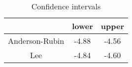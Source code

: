 \begin{table}[ht]
\centering
\begin{tabular}{ccc}
  \hline
 & lower & upper \\ 
  \hline
Anderson-Rubin & -4.88 & -4.56 \\ 
  Lee & -4.84 & -4.60 \\ 
   \hline
\end{tabular}
\caption{Confidence intervals} 
\label{tab:ci}
\end{table}
